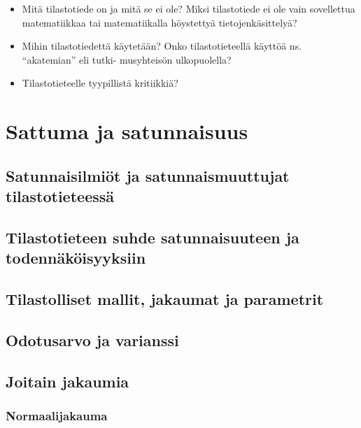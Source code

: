 \documentclass[
]{book}
\providecommand{\tightlist}{%
  \setlength{\itemsep}{0pt}\setlength{\parskip}{0pt}}
\begin{document}
\begin{itemize}
\tightlist
\item
  Mitä tilastotiede on ja mitä se ei ole? Miksi tilastotiede ei ole vain sovellettua matematiikkaa
  tai matematiikalla höystettyä tietojenkäsittelyä?
\item
  Mihin tilastotiedettä käytetään? Onko tilastotieteellä käyttöä ns. ``akatemian'' eli tutki-
  musyhteisön ulkopuolella?
\item
  Tilastotieteelle tyypillistä kritiikkiä?
\end{itemize}

\hypertarget{luku4}{%
\chapter{Sattuma ja satunnaisuus}\label{luku4}}

\hypertarget{alaluku41}{%
\section{Satunnaisilmiöt ja satunnaismuuttujat tilastotieteessä}\label{alaluku41}}

\hypertarget{alaluku42}{%
\section{Tilastotieteen suhde satunnaisuuteen ja todennäköisyyksiin}\label{alaluku42}}

\hypertarget{alaluku43}{%
\section{Tilastolliset mallit, jakaumat ja parametrit}\label{alaluku43}}

\hypertarget{alaluku44}{%
\section{Odotusarvo ja varianssi}\label{alaluku44}}

\hypertarget{alaluku45}{%
\section{Joitain jakaumia}\label{alaluku45}}

\hypertarget{normaalijakauma}{%
\subsection{Normaalijakauma}\label{normaalijakauma}}
\end{document}

